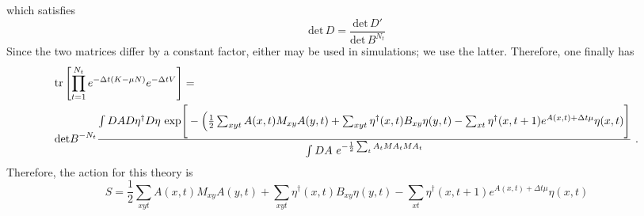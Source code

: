 which satisfies
\begin{equation}
\text{det}\, D = \frac{ \text{det}\, D' }{ \text{det}\, B^{N_t} }
\end{equation}
Since the two matrices differ by a constant factor, either may be used in simulations; we use the latter. Therefore, one finally has
\begin{align*}
& \text{tr}\left[\prod_{t=1}^{N_t} e^{-\Delta t(K - \mu N)}  e^{-\Delta t V}  \right] = \\
& {\text{det} B}^{-N_t} \frac{  
\int DA D\eta^{\dagger} D \eta ~ \text{exp}\Bigg[-\Big( \frac{1}{2} \sum_{x y t} A(x,t) M_{xy} A(y,t) + \sum_{x y t}\eta^{\dagger}(x,t) B_{x y} \eta(y,t) - \sum_{x t}\eta^{\dagger}(x,t+1) e^{A(x,t) + \Delta t \mu} \eta(x,t) \Bigg] 
}{ 
\int DA ~ e^{-\frac{1}{2} \sum_t {A}_t M {A}_t M A_t}  
}~.
\end{align*}
Therefore, the action for this theory is 
\begin{equation}
S =  \frac{1}{2} \sum_{x y t} A(x,t) M_{xy} A(y,t) + \sum_{x y t}\eta^{\dagger}(x,t) B_{x y} \eta(y,t) - \sum_{x t}\eta^{\dagger}(x,t+1) e^{A(x,t) + \Delta t \mu} \eta(x,t)
\end{equation}
